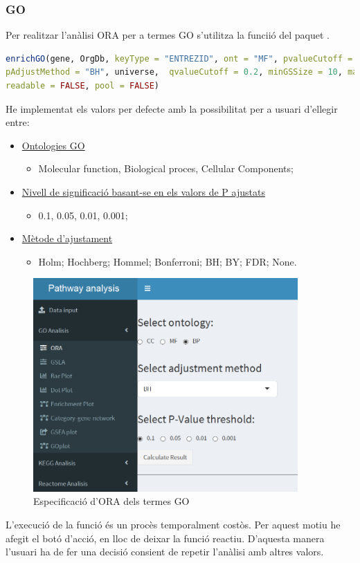 \documentclass[]{article}
\begin{document}
\subsubsection{GO}

Per realitzar l'anàlisi ORA per a termes GO s'utilitza la funciió  del paquet .
\begin{lstlisting}[language=R]
enrichGO(gene, OrgDb, keyType = "ENTREZID", ont = "MF", pvalueCutoff = 0.05, 
pAdjustMethod = "BH", universe,  qvalueCutoff = 0.2, minGSSize = 10, maxGSSize = 500,  
readable = FALSE, pool = FALSE)
\end{lstlisting}

He implementat els valors per defecte amb la possibilitat per a usuari d'ellegir entre:

\begin{itemize}
\item \underline{Ontologies GO} 
\begin{itemize}
\item Molecular function, Biological proces, Cellular Components;
\end{itemize}
\item \underline{Nivell de significació basant-se en els valors de P ajustats}
\begin{itemize}
\item 0.1, 0.05, 0.01, 0.001;
\end{itemize}
\item \underline{Mètode d'ajustament}
\begin{itemize}
\item Holm; Hochberg; Hommel; Bonferroni; BH; BY; FDR; None.
\end{itemize}
\end{itemize}

\begin{figure}[h!]
\includegraphics[width=0.9\textwidth]{App_F5_Items_GO_ORA.png}
\caption{Especificació d'ORA dels termes GO}
\end{figure}
L'execució de la funció és un procès temporalment costòs. Per aquest motiu he afegit el botó d'acció, en lloc de deixar la funció reactiu.  D'aquesta manera l'usuari ha de fer una decisió consient de repetir l'anàlisi amb altres valors.
\end{document}
